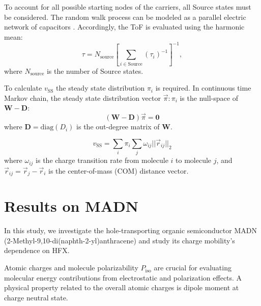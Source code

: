 \documentclass[letterpaper,12pt]{article}
\begin{document}
To account for all possible starting nodes of the carriers, all Source states must be considered. The random walk process can be modeled as a parallel electric network of capacitors \cite{doyle_random_2000}. Accordingly, the ToF is evaluated using the harmonic mean:
\begin{equation} 
\tau = N_\text{source} \left[\sum_{i \in \text{Source}} (\tau_i)^{-1}\right]^{-1},
\label{eq:ToF}
\end{equation}
where $N_\text{source}$ is the number of Source states.

To calculate $v_\text{SS}$ the steady state distribution $\pi_i$ is required. In continuous time Markov chain, the steady state distribution vector $\vec{\pi}: \pi_i$ is the null-space of $\mathbf{W}-\mathbf{D}$:
\begin{equation}
    (\mathbf{W}-\mathbf{D} )\vec{\pi} = \mathbf{0}
\end{equation}
where $\mathbf{D} = \text{diag}(D_i)$ is the out-degree matrix of $\mathbf{W}$.

\begin{equation}
    v_\text{SS} = \sum_i \pi_i \sum_j \omega_{ij} || \vec{r}_{ij}||_2
\end{equation} 
where $\omega_{ij}$ is the charge transition rate from molecule $i$ to molecule $j$, and $\vec{r}_{ij}=\vec{r}_j - \vec{r}_i$ is the center-of-mass (COM) distance vector. 

\section{Results on MADN}

In this study, we investigate the hole-transporting organic semiconductor MADN (2-Methyl-9,10-di(naphth-2-yl)anthracene) and study its charge mobility's dependence on HFX. 

Atomic charges and molecule polarizability $P_\text{iso}$ are crucial for evaluating molecular energy contributions from electrostatic and polarization effects. A physical property related to the overall atomic charges is dipole moment at charge neutral state. 
\end{document}
